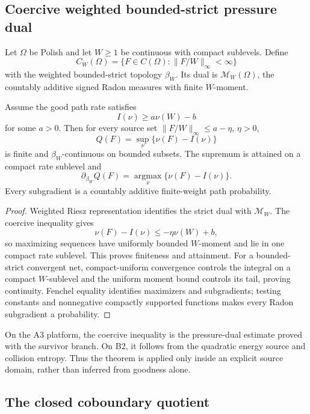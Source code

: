 \subsection{Coercive weighted bounded-strict pressure dual}

Let \(\Omega\) be Polish and let \(W\ge1\) be continuous with compact
sublevels.  Define
\[
 C_W(\Omega)=\{F\in C(\Omega):\|F/W\|_\infty<\infty\}
\]
with the weighted bounded-strict topology \(\beta_W\).  Its dual is
\(\mathcal M_W(\Omega)\), the countably additive signed Radon measures with
finite \(W\)-moment.

\begin{theorem}
\label{thm:r3-c2-strict}
Assume the good path rate satisfies
\[
 I(\nu)\ge a\nu(W)-b
\]
for some \(a>0\).  Then for every source set
\(\|F/W\|_\infty\le a-\eta\), \(\eta>0\),
\[
 Q(F)=\sup_\nu\{\nu(F)-I(\nu)\}
\]
is finite and \(\beta_W\)-continuous on bounded subsets.  The supremum is
attained on a compact rate sublevel and
\[
 \partial_{\beta_W}Q(F)
 =\operatorname*{argmax}_\nu\{\nu(F)-I(\nu)\}.
\]
Every subgradient is a countably additive finite-weight path probability.
\end{theorem}

\begin{proof}
Weighted Riesz representation identifies the strict dual with
\(\mathcal M_W\).  The coercive inequality gives
\[
 \nu(F)-I(\nu)
 \le -\eta\nu(W)+b,
\]
so maximizing sequences have uniformly bounded \(W\)-moment and lie in one
compact rate sublevel.  This proves finiteness and attainment.  For a
bounded-strict convergent net, compact-uniform convergence controls the
integral on a compact \(W\)-sublevel and the uniform moment bound controls its
tail, proving continuity.  Fenchel equality identifies maximizers and
subgradients; testing constants and nonnegative compactly supported functions
makes every Radon subgradient a probability.
\end{proof}

On the A3 platform, the coercive inequality is the pressure-dual estimate
proved with the survivor branch.  On B2, it follows from the quadratic energy
source and collision entropy.  Thus the theorem is applied only inside an
explicit source domain, rather than inferred from goodness alone.

\subsection{The closed coboundary quotient}


